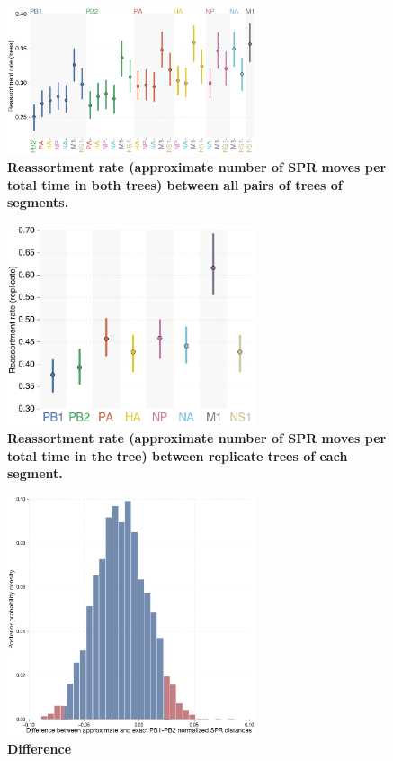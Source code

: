 \documentclass[11pt,oneside,letterpaper]{article}
\begin{document}
\begin{figure}
\centering  
\includegraphics[width=0.65\textwidth]  {supp_figures/InfB_supp_RErate_trees.png}
\caption{\textbf{Reassortment rate (approximate number of SPR moves per total time in both trees) between all pairs of trees of segments.}}
\label{}
\end{figure}

\begin{figure}
\centering  
\includegraphics[width=0.65\textwidth]  {supp_figures/InfB_supp_RErate_replicates.png}
\caption{\textbf{Reassortment rate (approximate number of SPR moves per total time in the tree) between replicate trees of each segment.}}
\label{}
\end{figure}

\begin{figure}
\centering  
\includegraphics[width=0.65\textwidth]  {supp_figures/InfB_supp_PB1-PB2_hist.png}
\caption{\textbf{Difference}}
\label{}
\end{figure}
\end{document}
